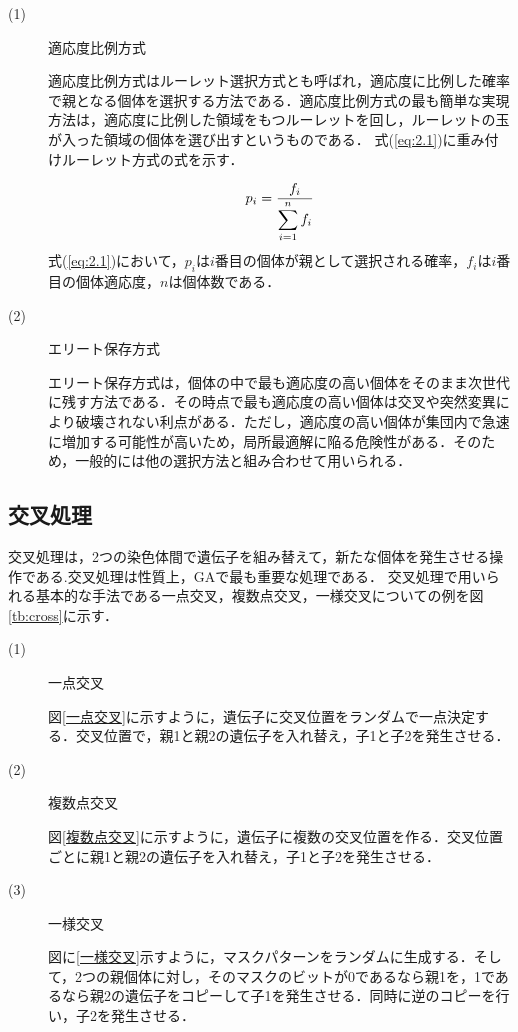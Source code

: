 \begin{description}
\item[ (1) ]適応度比例方式

適応度比例方式はルーレット選択方式とも呼ばれ，適応度に比例した確率で親となる個体を選択する方法である．適応度比例方式の最も簡単な実現方法は，適応度に比例した領域をもつルーレットを回し，ルーレットの玉が入った領域の個体を選び出すというものである．
式(\ref{eq:2.1})に重み付けルーレット方式の式を示す．



\begin{equation}
\vspace{1.0cm}
{p_i}=\frac{f_i}{\displaystyle\sum_{i=1}^{n}f_i}
\label{eq:2.1}
\vspace{-0.5cm}
\end{equation}
式(\ref{eq:2.1})において，$p_i$は$i$番目の個体が親として選択される確率，$f_i$は$i$番目の個体適応度，$n$は個体数である．

\item[ (2) ]エリート保存方式

エリート保存方式は，個体の中で最も適応度の高い個体をそのまま次世代に残す方法である．その時点で最も適応度の高い個体は交叉や突然変異により破壊されない利点がある．ただし，適応度の高い個体が集団内で急速に増加する可能性が高いため，局所最適解に陥る危険性がある．そのため，一般的には他の選択方法と組み合わせて用いられる．

\end{description}

\newpage

\subsection{交叉処理}
\label{sec2.1.4}

交叉処理は，2つの染色体間で遺伝子を組み替えて，新たな個体を発生させる操作である.交叉処理は性質上，GAで最も重要な処理である．
交叉処理で用いられる基本的な手法である一点交叉，複数点交叉，一様交叉についての例を図\ref{tb:cross}に示す．



\begin{description}
\item[ (1) ]一点交叉

図\ref{一点交叉}に示すように，遺伝子に交叉位置をランダムで一点決定する．交叉位置で，親1と親2の遺伝子を入れ替え，子1と子2を発生させる．


\item[ (2) ]複数点交叉

図\ref{複数点交叉}に示すように，遺伝子に複数の交叉位置を作る．交叉位置ごとに親1と親2の遺伝子を入れ替え，子1と子2を発生させる．

\item[ (3) ]一様交叉

図に\ref{一様交叉}示すように，マスクパターンをランダムに生成する．そして，2つの親個体に対し，そのマスクのビットが0であるなら親1を，1であるなら親2の遺伝子をコピーして子1を発生させる．同時に逆のコピーを行い，子2を発生させる．

\end{description}

